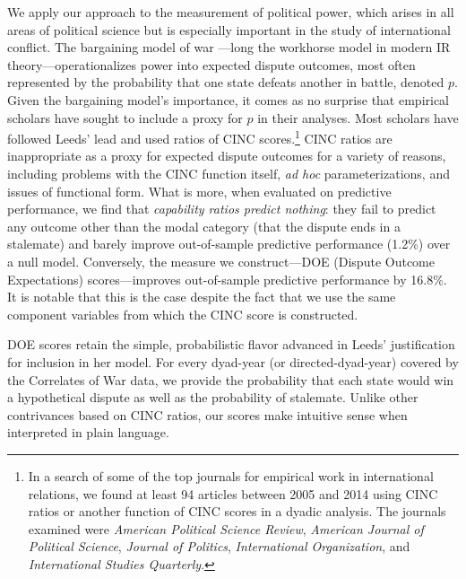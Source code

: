 We apply our approach to the measurement of political power, which arises in all areas of political science but is especially important in the study of international conflict.
The bargaining model of war \citep{fearon1995}---long the workhorse model in modern IR theory---operationalizes power into expected dispute outcomes, most often represented by the probability that one state defeats another in battle, denoted $p$.
Given the bargaining model's importance, it comes as no surprise that empirical scholars have sought to include a proxy for $p$ in their analyses.
Most scholars have followed Leeds' lead and used ratios of CINC scores.\footnote{
  \label{fn:replications}
  In a search of some of the top journals for empirical work in international relations, we found at least 94 articles between 2005 and 2014 using CINC ratios or another function of CINC scores in a dyadic analysis.
  The journals examined were \emph{American Political Science Review}, \emph{American Journal of Political Science}, \emph{Journal of Politics}, \emph{International Organization}, and \emph{International Studies Quarterly}.
}
CINC ratios are inappropriate as a proxy for expected dispute outcomes for a variety of reasons, including problems with the CINC function itself, \emph{ad hoc} parameterizations, and issues of functional form.
What is more, when evaluated on predictive performance, we find that \emph{capability ratios predict nothing}: they fail to predict any outcome other than the modal category (that the dispute ends in a stalemate) and barely improve out-of-sample predictive performance (1.2\%) over a null model.
Conversely, the measure we construct---DOE (Dispute Outcome Expectations) scores---improves out-of-sample predictive performance by 16.8\%.
It is notable that this is the case despite the fact that we use the same component variables from which the CINC score is constructed.

DOE scores retain the simple, probabilistic flavor advanced in Leeds' justification for inclusion in her model.  For every dyad-year (or directed-dyad-year) covered by the Correlates of War data, we provide the probability that each state would win a hypothetical dispute as well as the probability of stalemate.  Unlike other contrivances based on CINC ratios, our scores make intuitive sense when interpreted in plain language.

